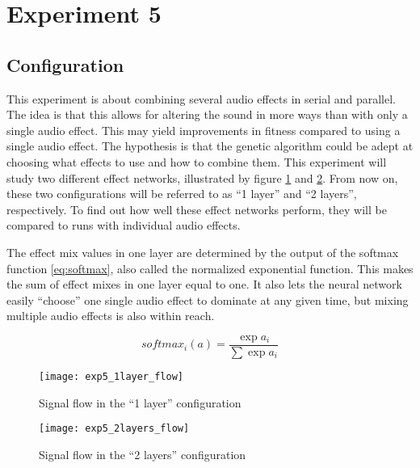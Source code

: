 \section{Experiment 5}

\subsection{Configuration}
This experiment is about combining several audio effects in serial and parallel. The idea is that this allows for altering the sound in more ways than with only a single audio effect. This may yield improvements in fitness compared to using a single audio effect. The hypothesis is that the genetic algorithm could be adept at choosing what effects to use and how to combine them. This experiment will study two different effect networks, illustrated by figure \ref{fig:exp5_1layer_flow} and \ref{fig:exp5_2layers_flow}. From now on, these two configurations will be referred to as ``1 layer'' and ``2 layers'', respectively. To find out how well these effect networks perform, they will be compared to runs with individual audio effects.

The effect mix values in one layer are determined by the output of the softmax function \eqref{eq:softmax}, also called the normalized exponential function. This makes the sum of effect mixes in one layer equal to one. It also lets the neural network easily ``choose'' one single audio effect to dominate at any given time, but mixing multiple audio effects is also within reach.

\begin{equation} \label{eq:softmax}
softmax_i(a)=\frac{\exp{a_i}}{\sum\exp{a_i}}
\end{equation}

\begin{figure}[H]
    \centering
    \texttt{[image: exp5\_1layer\_flow]}
    \caption{Signal flow in the ``1 layer'' configuration}
    \label{fig:exp5_1layer_flow}
\end{figure}

\begin{figure}[H]
    \centering
    \texttt{[image: exp5\_2layers\_flow]}
    \caption{Signal flow in the ``2 layers'' configuration}
    \label{fig:exp5_2layers_flow}
\end{figure}


